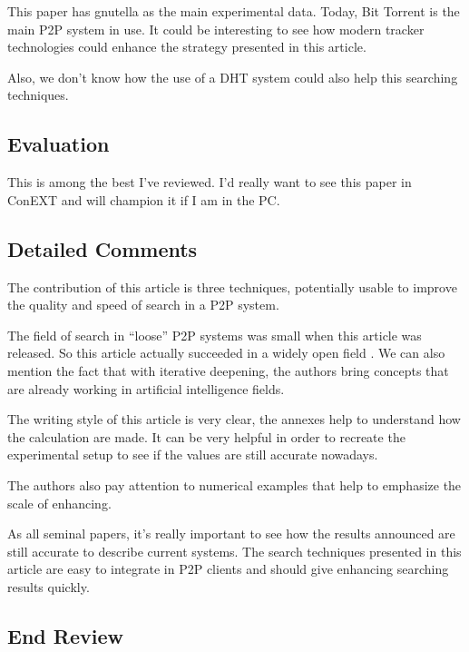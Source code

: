 This paper has gnutella as the main experimental data. Today, Bit Torrent is the main
P2P system in use. It could be interesting to see how modern tracker technologies could
enhance the strategy presented in this article.

Also, we don't know how the use of a DHT system could also help this searching techniques.

\subsection{Evaluation}

This is among the best I've reviewed. I'd really want to
see this paper in ConEXT and will champion it if I am in
the PC.

\subsection{Detailed Comments}


The contribution of this article is three techniques, potentially usable to improve the
quality and speed of search in a P2P system.


The field of search in ``loose'' P2P systems was small when this article was released.
So this article actually succeeded in a widely open field . We can also mention the fact
that with iterative deepening, the authors bring concepts that are already working in artificial
intelligence fields.


The writing style of this article is very clear, the annexes help to understand
how the calculation are made. It can be very helpful in order to recreate the experimental
setup to see if the values are still accurate nowadays.

The authors also pay attention to numerical examples that help to
 emphasize the scale of enhancing.


As all seminal papers, it's really important to see how the results announced are still accurate
to describe current systems. The search techniques presented in this article are easy to integrate
in P2P clients and should give enhancing searching results quickly.

\subsection*{End Review}

\pagebreak
